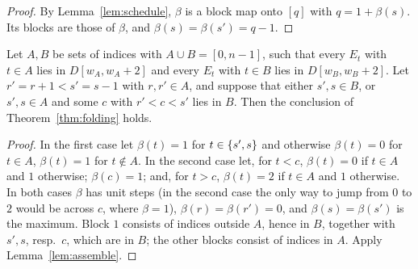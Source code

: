 \begin{proof}
By Lemma~\ref{lem:schedule}, $\beta$ is a block map onto $[q]$ with $q=1+\beta(s)$. Its blocks are those of $\beta$, and $\beta(s)=\beta(s')=q-1$.
\end{proof}


\begin{lemma}\label{lem:windows}
Let $A,B$ be sets of indices with $A\cup B=[0,n-1]$, such that every $E_t$ with $t\in A$ lies in $D[w_A,w_A+2]$ and every $E_t$ with $t\in
B$ lies in $D[w_B,w_B+2]$. Let $r'=r+1<s'=s-1$ with $r,r'\in A$, and suppose that either $s',s\in B$, or $s',s\in A$ and some $c$ with
$r'<c<s'$ lies in $B$. Then the conclusion of Theorem~\ref{thm:folding} holds.
\end{lemma}

\begin{proof}
In the first case let $\beta(t)=1$ for $t\in\left\{ s',s \right\}$ and otherwise $\beta(t)=0$ for $t\in A$, $\beta(t)=1$ for $t\notin A$. In the second
case let, for $t<c$, $\beta(t)=0$ if $t\in A$ and $1$ otherwise; $\beta(c)=1$; and, for $t>c$, $\beta(t)=2$ if $t\in A$ and $1$ otherwise.
In both cases $\beta$ has unit steps (in the second case the only way to jump from $0$ to $2$ would be across $c$, where $\beta=1$),
$\beta(r)=\beta(r')=0$, and $\beta(s)=\beta(s')$ is the maximum. Block $1$ consists of indices outside $A$, hence in $B$, together with
$s',s$, resp.\ $c$, which are in $B$; the other blocks consist of indices in $A$. Apply Lemma~\ref{lem:assemble}.
\end{proof}


